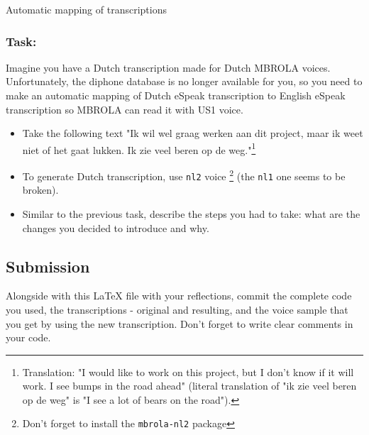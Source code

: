 \documentclass{../labbook}
\begin{document}
\begin{problem}{2}{3}{Automatic mapping of transcriptions}
\subsubsection*{Task:}
\noindent Imagine you have a Dutch transcription made for Dutch MBROLA voices. Unfortunately, the diphone database is no longer available for you, so you need to make an automatic mapping of Dutch eSpeak transcription to English eSpeak transcription so MBROLA can read it with US1 voice.
\begin{itemize}
    \item Take the following text "Ik wil wel graag werken aan dit project, maar ik weet niet of het gaat lukken. Ik zie veel beren op de weg."\footnote{Translation: "I would like to work on this project, but I don't know if it will work. I see bumps in the road ahead" (literal translation of "ik zie veel beren op de weg" is "I see a lot of bears on the road").}
    \item To generate Dutch transcription, use \texttt{nl2} voice \footnote{Don't forget to install the \texttt{mbrola-nl2} package} (the \texttt{nl1} one seems to be broken).
    \item Similar to the previous task, describe the steps you had to take: what are the changes you decided to introduce and why. 
\end{itemize}

\subsection*{Submission}
\noindent Alongside with this LaTeX file with your reflections, commit the complete code you used, the transcriptions - original and resulting, and the voice sample that you get by using the new transcription. Don't forget to write clear comments in your code.
\end{problem}
\end{document}

